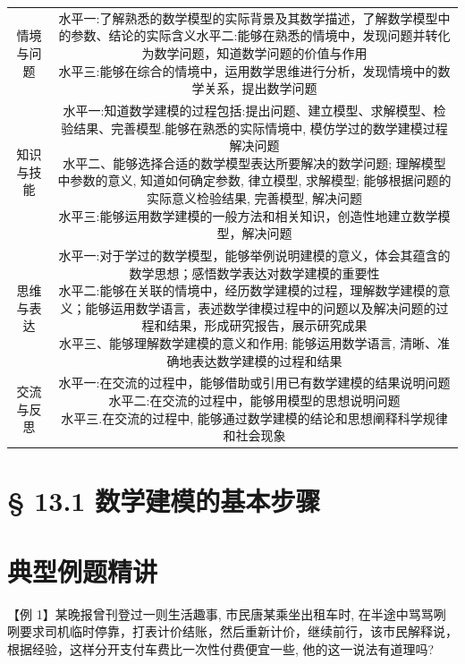 \begin{center}
\begin{tabular}{|c|c|}
\hline
情境与问题 & \makecell{ 水平一:了解熟悉的数学模型的实际背景及其数学描述，了解数学模型中的参数、结论的实际含义水平二:能够在熟悉的情境中，发现问题并转化为数学问题，知道数学问题的价值与作用 \\ 水平三:能够在综合的情境中，运用数学思维进行分析，发现情境中的数学关系，提出数学问题 } \\
\cline{1-2}
知识与技能 & \makecell{ 水平一:知道数学建模的过程包括:提出问题、建立模型、求解模型、检验结果、完善模型.能够在熟悉的实际情境中, 模仿学过的数学建模过程解决问题 \\ 水平二、能够选择合适的数学模型表达所要解决的数学问题; 理解模型中参数的意义, 知道如何确定参数, 律立模型, 求解模型; 能够根据问题的实际意义检验结果, 完善模型, 解决问题 \\ 水平三:能够运用数学建模的一般方法和相关知识，创造性地建立数学模型，解决问题 } \\
\cline{1-2}
思维与表达 & \makecell{ 水平一:对于学过的数学模型，能够举例说明建模的意义，体会其蕴含的数学思想；感悟数学表达对数学建模的重要性 \\ 水平二:能够在关联的情境中，经历数学建模的过程，理解数学建模的意义；能够运用数学语言，表述数学律模过程中的问题以及解决问题的过程和结果，形成研究报告，展示研究成果 \\ 水平三、能够理解数学建模的意义和作用; 能够运用数学语言, 清晰、准确地表达数学建模的过程和结果 } \\
\cline{1-2}
交流与反思 & \makecell{ 水平一:在交流的过程中，能够借助或引用已有数学建模的结果说明问题 \\ 水平二:在交流的过程中，能够用模型的思想说明问题 \\ 水平三.在交流的过程中, 能够通过数学建模的结论和思想阐释科学规律和社会现象 } \\
\cline{1-2}
\hline
\end{tabular}
\end{center}

\section*{§ 13.1 数学建模的基本步骤}

\section*{典型例题精讲}

【例 1】某晚报曾刊登过一则生活趣事, 市民唐某乘坐出租车时, 在半途中骂骂咧咧要求司机临时停靠，打表计价结账，然后重新计价，继续前行，该市民解释说，根据经验，这样分开支付车费比一次性付费便宜一些, 他的这一说法有道理吗?

